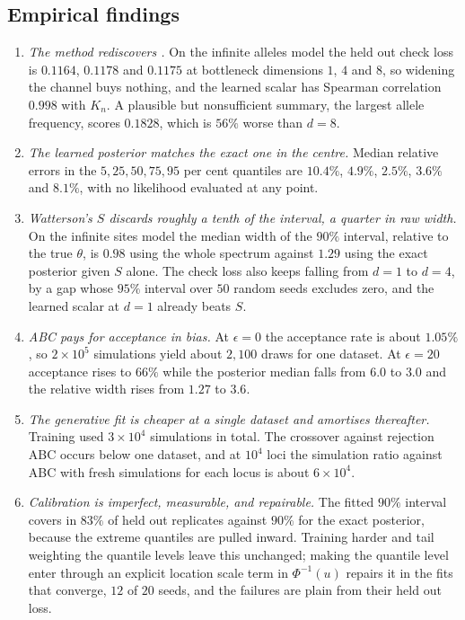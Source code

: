 \subsection{Empirical findings}
\label{suff:sec:findings}

\begin{enumerate}[leftmargin=1.8em,itemsep=3pt]
\item \emph{The method rediscovers \citet{suff:ewens1972}.} On the infinite alleles model the
held out check loss is $0.1164$, $0.1178$ and $0.1175$ at bottleneck dimensions $1$, $4$ and
$8$, so widening the channel buys nothing, and the learned scalar has Spearman correlation
$0.998$ with $K_n$. A plausible but nonsufficient summary, the largest allele frequency,
scores $0.1828$, which is $56\%$ worse than $d=8$.
\item \emph{The learned posterior matches the exact one in the centre.} Median relative errors
in the $5,25,50,75,95$ per cent quantiles are $10.4\%$, $4.9\%$, $2.5\%$, $3.6\%$ and
$8.1\%$, with no likelihood evaluated at any point.
\item \emph{Watterson's $S$ discards roughly a tenth of the interval, a quarter in raw width.} On the infinite sites
model the median width of the $90\%$ interval, relative to the true $\theta$, is $0.98$ using
the whole spectrum against $1.29$ using the exact posterior given $S$ alone. The check loss
also keeps falling from $d=1$ to $d=4$, by a gap whose $95\%$ interval over $50$ random seeds excludes zero,
and the learned scalar at $d=1$ already beats $S$.
\item \emph{ABC pays for acceptance in bias.} At $\epsilon=0$ the acceptance rate is about
$1.05\%$, so $2\times10^5$ simulations yield about $2{,}100$ draws for one dataset. At
$\epsilon=20$ acceptance rises to $66\%$ while the posterior median falls from $6.0$ to $3.0$
and the relative width rises from $1.27$ to $3.6$.
\item \emph{The generative fit is cheaper at a single dataset and amortises thereafter.}
Training used $3\times10^4$ simulations in total. The crossover against rejection ABC occurs
below one dataset, and at $10^4$ loci the simulation ratio against ABC with fresh simulations for each locus is about $6\times10^4$.
\item \emph{Calibration is imperfect, measurable, and repairable.} The fitted $90\%$ interval
covers in $83\%$ of held out replicates against $90\%$ for the exact posterior, because the
extreme quantiles are pulled inward. Training harder and tail weighting the quantile levels
leave this unchanged; making the quantile level enter through an explicit location scale
term in $\Phi^{-1}(u)$ repairs it in the fits that converge, $12$ of $20$ seeds, and the
failures are plain from their held out loss.
\end{enumerate}

